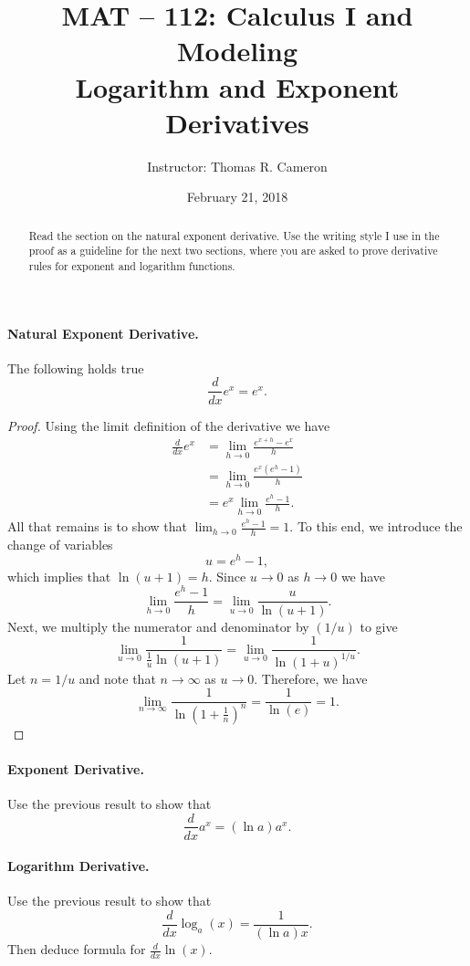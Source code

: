 \documentclass{article}
\title{MAT -- 112: Calculus I and Modeling\\
\large{Logarithm and Exponent Derivatives}}
\author{Instructor: Thomas R. Cameron}
\date{February 21, 2018}
\begin{document}
\maketitle

\begin{abstract}
Read the section on the natural exponent derivative. Use the writing style I use in the proof as a guideline for the next two sections, where you are asked to
prove derivative rules for exponent and logarithm functions.
\end{abstract}

\paragraph*{Natural Exponent Derivative.} The following holds true
\[
\frac{d}{dx}e^{x}=e^{x}.
\] 
\begin{proof}
Using the limit definition of the derivative we have
\begin{align*}
\frac{d}{dx}e^{x}&=\lim_{h\rightarrow 0}\frac{e^{x+h}-e^{x}}{h} \\
&=\lim_{h\rightarrow 0}\frac{e^{x}\left(e^{h}-1\right)}{h} \\
&=e^{x}\lim_{h\rightarrow 0}\frac{e^{h}-1}{h}.
\end{align*}
All that remains is to show that $\lim_{h\rightarrow 0}\frac{e^{h}-1}{h}=1$. To this end, we introduce the change of variables
\[
u=e^{h}-1,
\]
which implies that $\ln(u+1)=h$. Since $u\rightarrow 0$ as $h\rightarrow 0$ we have
\[
\lim_{h\rightarrow 0}\frac{e^{h}-1}{h}=\lim_{u\rightarrow 0}\frac{u}{\ln(u+1)}. 
\]
Next, we multiply the numerator and denominator by $(1/u)$ to give
\[
\lim_{u\rightarrow 0}\frac{1}{\frac{1}{u}\ln(u+1)} = \lim_{u\rightarrow 0}\frac{1}{\ln(1+u)^{1/u}}.
\]
Let $n=1/u$ and note that $n\rightarrow\infty$ as $u\rightarrow 0$. Therefore, we have
\[
\lim_{n\rightarrow\infty}\frac{1}{\ln(1+\frac{1}{n})^{n}}=\frac{1}{\ln(e)}=1.
\]
\end{proof}

\paragraph*{Exponent Derivative.}	Use the previous result to show that
\[
\frac{d}{dx}a^{x}=(\ln a)a^{x}.
\]

\vspace{17em}

\paragraph*{Logarithm Derivative.}	Use the previous result to show that
\[
\frac{d}{dx}\log_{a}(x) = \frac{1}{(\ln a) x}.
\]
Then deduce formula for $\frac{d}{dx}\ln(x)$. 
\end{document}
